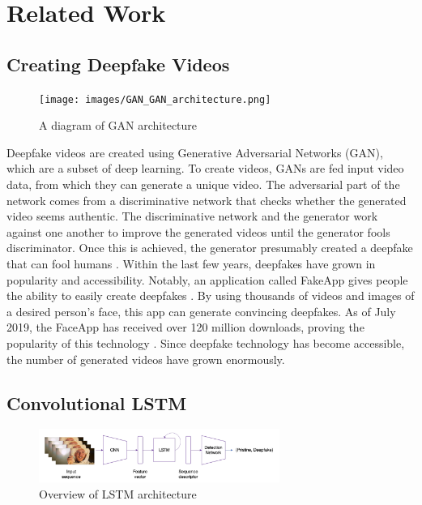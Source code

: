 \documentclass[a4paper]{article}
\begin{document}
\section{Related Work}

\subsection{Creating Deepfake Videos} 

\begin{figure}[ht]
\centering
\texttt{[image: images/GAN\_GAN\_architecture.png]}
\caption{A diagram of GAN architecture \cite{GAN-arch}}
\label{fig:GAN}
\end{figure}

Deepfake videos are created using Generative Adversarial Networks (GAN), which are a subset of deep learning. To create videos, GANs are fed input video data, from which they can generate a unique video. The adversarial part of the network comes from a discriminative network that checks whether the generated video seems authentic. The discriminative network and the generator work against one another to improve the generated videos until the generator fools discriminator. Once this is achieved, the generator presumably created a deepfake that can fool humans \cite{GAN}. Within the last few years, deepfakes have grown in popularity and accessibility. Notably, an application called FakeApp gives people the ability to easily create deepfakes \cite{FaceApp}. By using thousands of videos and images of a desired person’s face, this app can generate convincing deepfakes. As of July 2019, the FaceApp has received over 120 million downloads, proving the popularity of this technology \cite{FaceAppStat}. Since deepfake technology has become accessible, the number of generated videos have grown enormously.

\subsection{Convolutional LSTM} 

\begin{figure}[ht]
\centering
\includegraphics[width=0.7\textwidth]{images/LSTM_architecture.png}
\caption{Overview of LSTM architecture \cite{Delp}}
\label{fig:lstm}
\end{figure}
\end{document}
